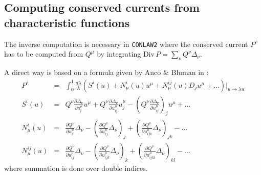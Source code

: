 \subsection{Computing conserved currents from \\ 
            characteristic functions}
The inverse computation is necessary in {\tt CONLAW2} where the
conserved current $P^i$ has to be computed from $Q^{\mu}$ by
integrating $\mbox{Div}\,P = \sum_{\nu} Q^{\nu} \Delta_{\nu}$.

A direct way is based on a formula %
given by Anco \& Bluman in \cite{AB}:
\begin{eqnarray}
P^i & = & \int^1_0 \frac{d \lambda}{\lambda} 
       \left(S^i(u) + N^i_{\mu}(u)u^{\mu} + N^{ij}_{\mu}(u)D_ju^{\mu} 
        + \ldots\right)|_{u\rightarrow \lambda u}  \label{ab0} \\
S^i(u) & = & Q^{\nu}\frac{\partial \Delta_{\nu}}{\partial u^{\mu}_i}u^{\mu} + 
          Q^{\nu}\frac{\partial \Delta_{\nu}}{\partial u^{\mu}_{ij}}u^{\mu}_j -
          \left(Q^{\nu}\frac{\partial \Delta_{\nu}}{\partial 
                                  u^{\mu}_{ij}}\right)_{j}u^{\mu} + \ldots 
         \label{ab1} \\
N^i_{\mu}(u) & = & \frac{\partial Q^{\nu}}{\partial u^{\mu}_i}\Delta_{\nu} - 
          \left(\frac{\partial Q^{\nu}}{\partial u^{\mu}_{ij}}\Delta_{\nu}\right)_{j} +
          \left(\frac{\partial Q^{\nu}}{\partial u^{\mu}_{ijk}}\Delta_{\nu}\right)_{jk} - \ldots   \label{ab2} \\
N^{ij}_{\mu}(u) & = & \frac{\partial Q^{\nu}}{\partial u^{\mu}_{ij}}\Delta_{\nu} - 
          \left(\frac{\partial Q^{\nu}}{\partial u^{\mu}_{ijk}}\Delta_{\nu}\right)_{k} +
          \left(\frac{\partial Q^{\nu}}{\partial u^{\mu}_{ijkl}}\Delta_{\nu}\right)_{kl} - \ldots  \label{ab3}
\end{eqnarray}
where summation is done over double indices.

